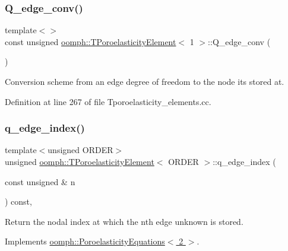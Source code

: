 \subsubsection{\texorpdfstring{Q\+\_\+edge\+\_\+conv()}{Q\_edge\_conv()}\hspace{0.1cm}{\footnotesize\ttfamily [2/2]}}
{\footnotesize\ttfamily template$<$$>$ \\
const unsigned \hyperlink{classoomph_1_1TPoroelasticityElement}{oomph\+::\+T\+Poroelasticity\+Element}$<$ 1 $>$\+::Q\+\_\+edge\+\_\+conv (\begin{DoxyParamCaption}{ }\end{DoxyParamCaption})\hspace{0.3cm}{\ttfamily [private]}}



Conversion scheme from an edge degree of freedom to the node it\textquotesingle{}s stored at. 



Definition at line 267 of file Tporoelasticity\+\_\+elements.\+cc.

\mbox{\label{classoomph_1_1TPoroelasticityElement_a3486524ccf5ec2c3213a700a8d9beddd}} 
\subsubsection{\texorpdfstring{q\+\_\+edge\+\_\+index()}{q\_edge\_index()}}
{\footnotesize\ttfamily template$<$unsigned O\+R\+D\+ER$>$ \\
unsigned \hyperlink{classoomph_1_1TPoroelasticityElement}{oomph\+::\+T\+Poroelasticity\+Element}$<$ O\+R\+D\+ER $>$\+::q\+\_\+edge\+\_\+index (\begin{DoxyParamCaption}\item[{const unsigned \&}]{n }\end{DoxyParamCaption}) const\hspace{0.3cm}{\ttfamily [inline]}, {\ttfamily [virtual]}}



Return the nodal index at which the nth edge unknown is stored. 



Implements \hyperlink{classoomph_1_1PoroelasticityEquations_abe5fd6d829fcefd5760c8802f7887631}{oomph\+::\+Poroelasticity\+Equations$<$ 2 $>$}.



